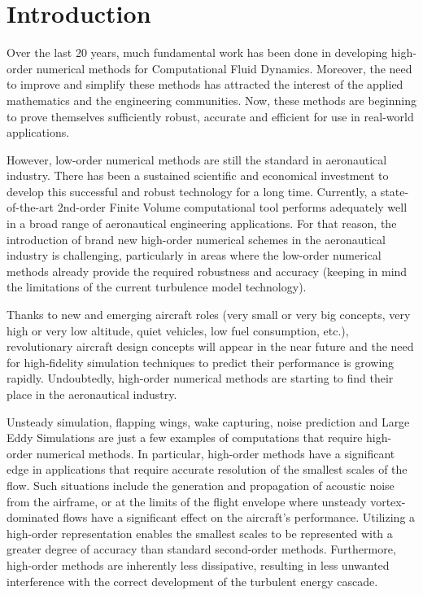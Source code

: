 
\section{Introduction}

Over the last 20 years, much fundamental work has been done in developing high-order numerical methods for Computational Fluid Dynamics. Moreover, the need to improve and simplify these methods has attracted the interest of the applied mathematics and the engineering communities. Now, these methods are beginning to prove themselves sufficiently robust, accurate and efficient for use in real-world applications.

However, low-order numerical methods are still the standard in aeronautical industry. There has been a sustained scientific and economical investment to develop this successful and robust technology for a long time. Currently, a state-of-the-art 2nd-order Finite Volume computational tool performs adequately well in a broad range of aeronautical engineering applications. For that reason, the introduction of brand new high-order numerical schemes in the aeronautical industry is challenging, particularly in areas where the low-order numerical methods already provide the required robustness and accuracy (keeping in mind the limitations of the current turbulence model technology).

Thanks to new and emerging aircraft roles (very small or very big concepts, very high or very low altitude, quiet vehicles, low fuel consumption, etc.), revolutionary aircraft design concepts will appear in the near future and the need for high-fidelity simulation techniques to predict their performance is growing rapidly. Undoubtedly, high-order numerical methods are starting to find their place in the aeronautical industry. 

Unsteady simulation, flapping wings, wake capturing, noise prediction and Large Eddy Simulations are just a few examples of computations that require high-order numerical methods. In particular, high-order methods have a significant edge in applications that require accurate resolution of the smallest scales of the flow. Such situations include the generation and propagation of acoustic noise from the airframe, or at the limits of the flight envelope where unsteady vortex-dominated flows have a significant effect on the aircraft's performance. Utilizing a high-order representation enables the smallest scales to be represented with a greater degree of accuracy than standard second-order methods. Furthermore, high-order methods are inherently less dissipative, resulting in less unwanted interference with the correct development of the turbulent energy cascade. 


